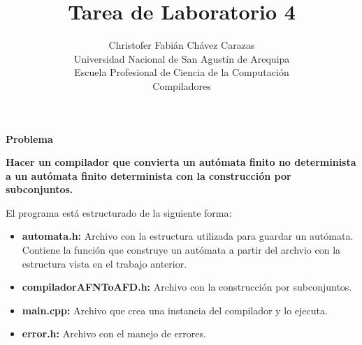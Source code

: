 \documentclass[a4paper,12pt]{article}
\begin{document}
\title{Tarea de Laboratorio 4}
\author{
Christofer Fabián Chávez Carazas \\
\small{Universidad Nacional de San Agustín de Arequipa} \\
\small{Escuela Profesional de Ciencia de la Computación} \\
\small{Compiladores}
}
\date{}

\maketitle

\begin{large}
 \textbf{Problema}
\end{large}

\textbf{Hacer un compilador que convierta un autómata finito no determinista a un autómata finito determinista con la construcción por subconjuntos.}

El programa está estructurado de la siguiente forma:

\begin{itemize}
 \item \textbf{automata.h:} Archivo con la estructura utilizada para guardar un autómata. Contiene la función que construye un autómata a partir del archvio con la estructura
 vista en el trabajo anterior.
 \item \textbf{compiladorAFNToAFD.h:} Archivo con la construcción por subconjuntos.
 \item \textbf{main.cpp:} Archivo que crea una instancia del compilador y lo ejecuta.
 \item \textbf{error.h:} Archivo con el manejo de errores.
\end{itemize}
\end{document}
